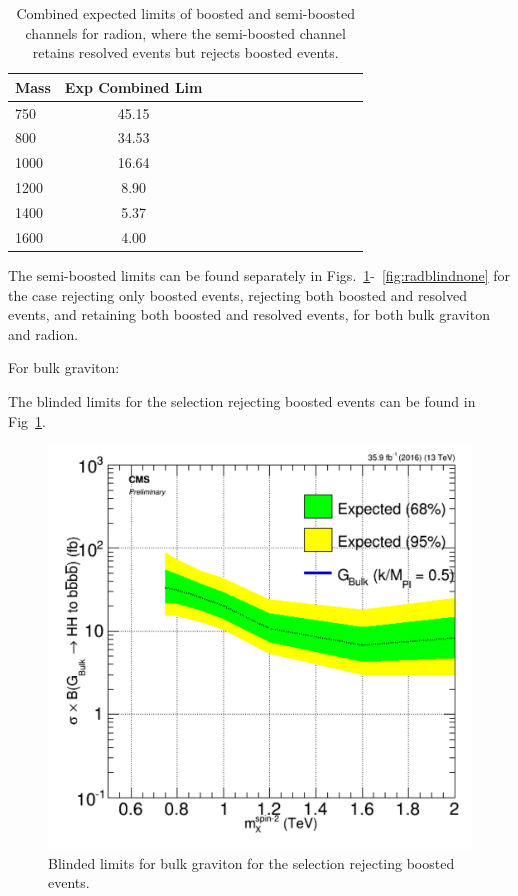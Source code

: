 \begin{table}[h]
\begin{tabular}{|l|c|c|c|c|c|c|c|c|c|c|c|c|}
\hline
Mass & Exp Combined Lim \\ \hline
750 & 45.15\\
800 & 34.53\\
1000 & 16.64\\
1200 & 8.90\\
1400 & 5.37\\
1600 & 4.00\\
\hline
\end{tabular}
\caption{Combined expected limits of boosted and semi-boosted channels for radion, where the semi-boosted channel retains resolved events but rejects boosted events.}
\label{tab:1p12p1Rad}
\end{table}

The semi-boosted limits can be found separately in Figs.~\ref{fig:BGblindboost}-~\ref{fig:radblindnone} for the case rejecting only boosted events, rejecting both boosted and resolved events, and retaining both boosted and resolved events, for both bulk graviton and radion.

For bulk graviton:

The blinded limits for the selection rejecting boosted events can be found in Fig~\ref{fig:BGblindboost}.

\begin{figure}[thb!]
\begin{center}
\includegraphics[scale=0.5]{Figures/brazflag_BG_boost_v2.pdf}
\end{center}
\caption{Blinded limits for bulk graviton for the selection rejecting boosted events.}
\label{fig:BGblindboost}
\end{figure} 

